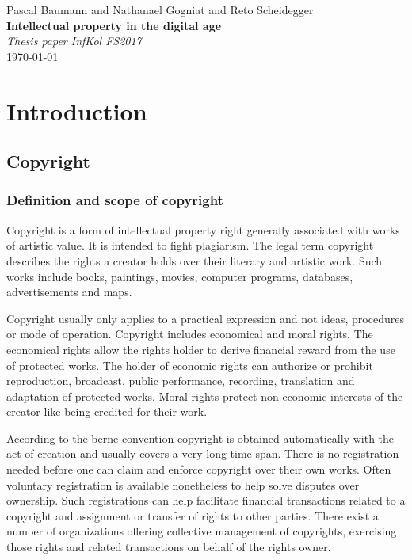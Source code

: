 \documentclass[a4paper]{report}
\newcommand*{\titleAP}{\begingroup %
	\centering
	\vspace*{\baselineskip} %
	
	{\Large Pascal Baumann} and {\Large Nathanael Gogniat} and {\Large Reto Scheidegger}\\[0.167\textheight] %
	
	{\Huge\bfseries Intellectual property in the digital age}\\[\baselineskip]
	
	{\Large \textit{Thesis paper InfKol FS2017}}\\
	\today
	
	\vspace*{3\baselineskip} %
	\endgroup}
\begin{document}
\titleAP

\begin{abstract}
	\blindtext
\end{abstract}
\newpage

\tableofcontents

\newpage

\chapter{Introduction}
\label{ch:Intro}

\section{Copyright}
\label{sec:Copyright}

\subsection{Definition and scope of copyright}
\label{sec:CopyDef}
Copyright is a form of intellectual property right generally associated with works of artistic value. It is intended to fight plagiarism. The legal term copyright describes the rights a creator holds over their literary and artistic work. Such works include books, paintings, movies, computer programs, databases, advertisements and maps.

Copyright usually only applies to a practical expression and not ideas, procedures or mode of operation. Copyright includes economical and moral rights. The economical rights allow the rights holder to derive financial reward from the use of protected works. The holder of economic rights can authorize or prohibit reproduction, broadcast, public performance, recording, translation and adaptation of protected works. Moral rights protect non-economic interests of the creator like being credited for their work. 

According to the berne convention copyright is obtained automatically with the act of creation and usually covers a very long time span. There is no registration needed before one can claim and enforce copyright over their own works. Often voluntary registration is available nonetheless to help solve disputes over ownership. Such registrations can help facilitate financial transactions related to a copyright and assignment or transfer of rights to other parties. There exist a number of organizations offering collective management of copyrights, exercising those rights and related transactions on behalf of the rights owner.
\end{document}

